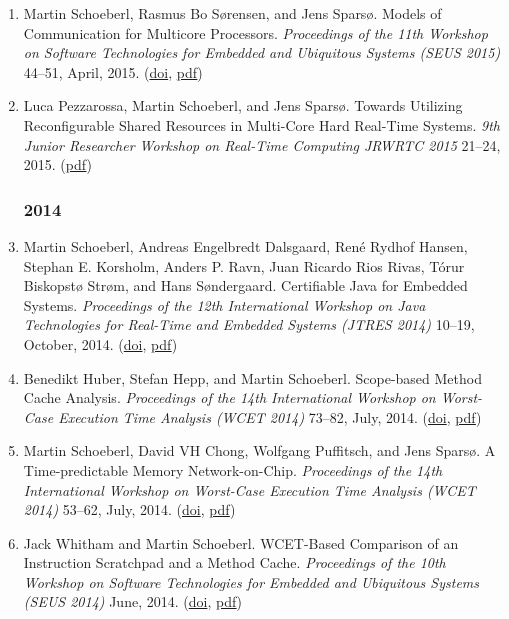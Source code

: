 \begin{enumerate}
\item Martin Schoeberl, Rasmus Bo S{\o}rensen, and Jens Spars{\o}.
 Models of Communication for Multicore Processors.
 \emph{Proceedings of the 11th Workshop on Software Technologies for Embedded and Ubiquitous Systems (SEUS 2015)} 44--51, April, 2015.
(\href{http://dx.doi.org/10.1109/ISORCW.2015.57}{doi}, \href{http://www.jopdesign.com/doc/modcomm.pdf}{pdf})

\item Luca Pezzarossa, Martin Schoeberl, and Jens Spars{\o}.
 Towards Utilizing Reconfigurable Shared Resources in Multi-Core Hard Real-Time Systems.
 \emph{9th Junior Researcher Workshop on Real-Time Computing JRWRTC 2015} 21--24, 2015.
(\href{http://www.jopdesign.com/doc/dpr-mcp.pdf}{pdf})


\subsubsection*{2014}

\item Martin Schoeberl, Andreas Engelbredt Dalsgaard, Ren\'{e} Rydhof Hansen, Stephan E. Korsholm, Anders P. Ravn, Juan Ricardo Rios Rivas, T\'{o}rur Biskopst{\o} Str{\o}m, and Hans S{\o}ndergaard.
 Certifiable Java for Embedded Systems.
 \emph{Proceedings of the 12th International Workshop on Java Technologies for Real-Time and Embedded Systems (JTRES 2014)} 10--19, October, 2014.
(\href{http://dx.doi.org/10.1145/2661020.2661025}{doi}, \href{http://www.jopdesign.com/doc/cj4es.pdf}{pdf})

\item Benedikt Huber, Stefan Hepp, and Martin Schoeberl.
 Scope-based Method Cache Analysis.
 \emph{Proceedings of the 14th International Workshop on Worst-Case Execution Time Analysis (WCET 2014)} 73--82, July, 2014.
(\href{http://dx.doi.org/10.4230/OASIcs.WCET.2014.73}{doi}, \href{http://www.jopdesign.com/doc/mcana.pdf}{pdf})

\item Martin Schoeberl, David VH Chong, Wolfgang Puffitsch, and Jens Spars{\o}.
 A Time-predictable Memory Network-on-Chip.
 \emph{Proceedings of the 14th International Workshop on Worst-Case Execution Time Analysis (WCET 2014)} 53--62, July, 2014.
(\href{http://dx.doi.org/10.4230/OASIcs.WCET.2014.53}{doi}, \href{http://www.jopdesign.com/doc/memnoc.pdf}{pdf})

\item Jack Whitham and Martin Schoeberl.
 WCET-Based Comparison of an Instruction Scratchpad and a Method Cache.
 \emph{Proceedings of the 10th Workshop on Software Technologies for Embedded and Ubiquitous Systems (SEUS 2014)} June, 2014.
(\href{http://dx.doi.org/10.1109/ISORC.2014.48}{doi}, \href{http://www.jopdesign.com/doc/spmvsmc.pdf}{pdf})


\end{enumerate}

